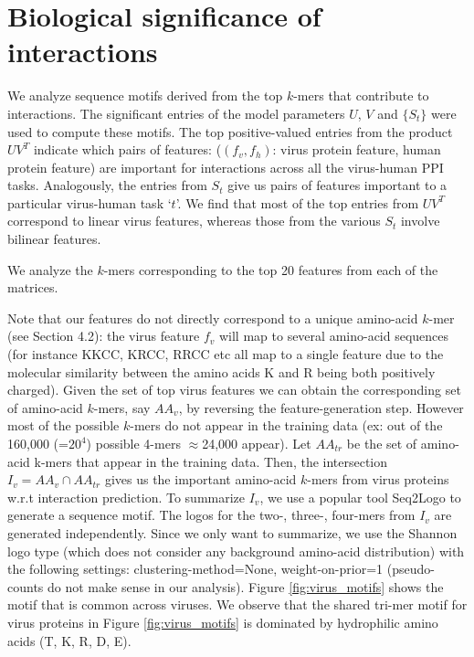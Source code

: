 \documentclass[a4paper,11pt]{article}
\begin{document}
\section{Biological significance of interactions} 

We analyze sequence motifs derived from the top $k$-mers that contribute to interactions. The significant entries of the model parameters $U$, $V$ and $\{S_t\}$ were used to
compute these motifs. The top positive-valued entries from the product $U V^T$ indicate which pairs of features: ($(f_v, f_h)$: virus protein feature, human protein feature) are important for interactions across all the virus-human PPI tasks.
Analogously, the entries from $S_t$ give us pairs of features important to a particular virus-human task `$t$'.
We find that most of the top entries from $U V^T$ correspond to linear virus features, whereas those from the various $S_t$
involve bilinear features. 

We analyze the $k$-mers corresponding to the top 20 features from each of the matrices.

Note that our features do not directly correspond to a unique amino-acid $k$-mer (see Section 4.2):
the virus feature $f_v$ will map to several amino-acid sequences (for instance KKCC, KRCC, RRCC etc all map to a single feature due to the molecular similarity between the amino acids K and R being both positively charged). Given the set of top virus features we can obtain the corresponding set of
amino-acid $k$-mers, say $AA_v$, by reversing the feature-generation step. However most of the possible $k$-mers do not appear in the
training data (ex: out of the 160,000 (=$20^4$) possible 4-mers $\approx$24,000 appear). Let $AA_{tr}$
be the set of amino-acid k-mers that appear in the training data. Then, the intersection $I_v = AA_v \cap AA_{tr}$ gives us the important amino-acid $k$-mers from virus proteins w.r.t interaction prediction.
To summarize $I_v$, we use a popular tool Seq2Logo to generate a sequence motif.
The logos for the two-, three-, four-mers from $I_v$ are generated independently. Since we only
want to summarize, we use the Shannon logo type (which does not consider any background amino-acid distribution)
with the following settings: clustering-method=None, weight-on-prior=1 (pseudo-counts do not make sense in our
analysis). Figure \ref{fig:virus_motifs} shows the motif that is common across viruses. %
We observe that the shared tri-mer motif for virus proteins in Figure \ref{fig:virus_motifs} is dominated by
hydrophilic amino acids (T, K, R, D, E).
\end{document}
